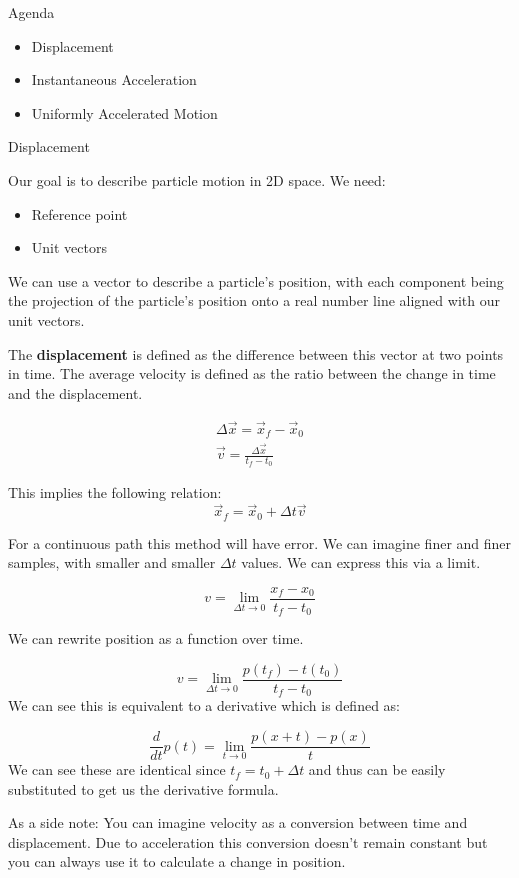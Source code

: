 \documentclass{report}
\begin{document}
{\large Agenda}
\begin{itemize}
    \item Displacement
    \item Instantaneous Acceleration
    \item Uniformly Accelerated Motion
\end{itemize}

{\large Displacement}
\begin{mdframed}
   Our goal is to describe particle motion in 2D 
   space. We need:
   \begin{itemize}
       \item Reference point
       \item Unit vectors
   \end{itemize}

   We can use a vector to describe a particle's position, with
   each component being the projection of the particle's position
   onto a real number line aligned with our unit vectors.

   The \textbf{displacement} is defined as the difference
   between this vector at two points in time. The average
   velocity is defined as the ratio between the change in
   time and the displacement.

   \begin{gather}
       \Delta\vec{x} = \vec{x}_f - \vec{x}_0\\
       \vec{v} = \frac{\Delta\vec{x}}{t_f - t_0}
   \end{gather}

   This implies the following relation:
   \begin{displaymath}
       \vec{x}_f = \vec{x}_0 + \Delta t \vec{v} 
   \end{displaymath}

   For a continuous path this method will have error. We can
   imagine finer and finer samples, with smaller and smaller
   $\Delta t$ values. We can express this via a limit.

   \begin{displaymath}
       v = \lim_{\Delta t \to 0} \frac{x_f - x_0}{t_f - t_0}
   \end{displaymath}
   
   We can rewrite position as a function over time.

   \begin{displaymath}
       v = \lim_{\Delta t \to 0} \frac{p(t_f) - t(t_0)}{t_f - t_0}
   \end{displaymath}
   We can see this is equivalent to a derivative which is
   defined as:

   \begin{displaymath}
        \frac{d}{dt}p(t) = \lim_{t \to 0} \frac{p(x + t) - p(x)}{t}
   \end{displaymath}
   We can see these are identical since $t_f = t_0 + \Delta t$
   and thus can be easily substituted to get us the derivative
   formula.


   \begin{center}
   \end{center}
\end{mdframed}
\begin{mdframed}
    As a side note: You can imagine velocity as a conversion
    between time and displacement. Due to acceleration this
    conversion doesn't remain constant but you can always
    use it to calculate a change in position.
\end{mdframed}
\end{document}
